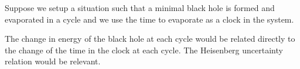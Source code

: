 Suppose we setup a situation such that a minimal black hole is formed and evaporated in a cycle and we use the time to evaporate as a clock in the system.

The change in energy of the black hole at each cycle would be related directly to the change of the time in the clock at each cycle. The Heisenberg uncertainty relation would be relevant.
